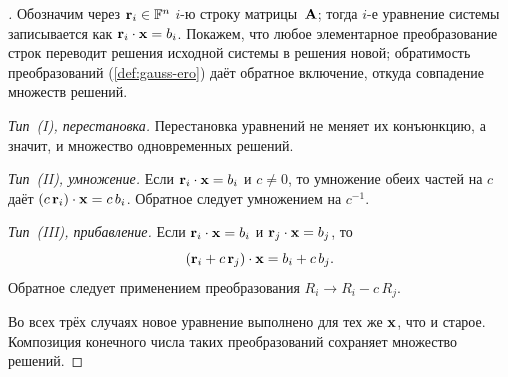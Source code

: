 \begin{proof}[]
Обозначим через $\mathbf{r}_i \in \mathbb{F}^n$ $i$-ю строку матрицы~$\mathbf{A}$;
тогда $i$-е уравнение системы записывается как
$\mathbf{r}_i \cdot \mathbf{x} = b_i$. Покажем, что любое элементарное
преобразование строк переводит решения исходной системы в решения
новой; обратимость преобразований (\cref{def:gauss-ero}) даёт обратное
включение, откуда совпадение множеств решений.

\emph{Тип~(I), перестановка.} Перестановка уравнений не меняет их
конъюнкцию, а значит, и множество одновременных решений.

\emph{Тип~(II), умножение.} Если $\mathbf{r}_i \cdot \mathbf{x} = b_i$ и
$c \neq 0$, то умножение обеих частей на $c$ даёт
$(c\,\mathbf{r}_i) \cdot \mathbf{x} = c\,b_i$. Обратное следует умножением
на $c^{-1}$.

\emph{Тип~(III), прибавление.} Если $\mathbf{r}_i \cdot \mathbf{x} = b_i$
и $\mathbf{r}_j \cdot \mathbf{x} = b_j$, то
\[
  (\mathbf{r}_i + c\,\mathbf{r}_j) \cdot \mathbf{x} = b_i + c\,b_j.
\]
Обратное следует применением преобразования $R_i \to R_i - c\,R_j$.

Во всех трёх случаях новое уравнение выполнено для тех же $\mathbf{x}$,
что и старое. Композиция конечного числа таких преобразований сохраняет
множество решений.
\end{proof}

